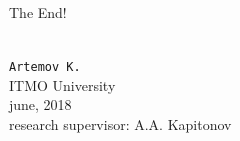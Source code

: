 \documentclass[newPxFont,numfooter,sectionpages]{beamer}
\begin{document}
\begin{frame}{The End!}
	\begin{center}
	 \\
	\texttt{Artemov K.}\\
	ITMO University\\
	june, 2018\\
	research supervisor: A.A. Kapitonov
	\end{center}

\end{frame}
\begingroup
{}
\begin{frame}[plain]
	
	\begin{center}
	\\
	\\
\end{center}	
\end{frame}
\endgroup
\end{document}
